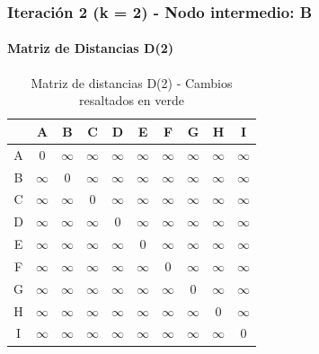 \documentclass[12pt]{article}
\begin{document}
\subsubsection{Iteración 2 (k = 2) - Nodo intermedio: B}
\paragraph{Matriz de Distancias D(2)}
\begin{table}[h!]
\centering
\begin{tabular}{|c|c|c|c|c|c|c|c|c|c|}
\hline
 & A & B & C & D & E & F & G & H & I \\\hline
A & 0 & $\infty$ & $\infty$ & $\infty$ & $\infty$ & $\infty$ & $\infty$ & $\infty$ & $\infty$ \\\hline
B & $\infty$ & 0 & $\infty$ & $\infty$ & $\infty$ & $\infty$ & $\infty$ & $\infty$ & $\infty$ \\\hline
C & $\infty$ & $\infty$ & 0 & $\infty$ & $\infty$ & $\infty$ & $\infty$ & $\infty$ & $\infty$ \\\hline
D & $\infty$ & $\infty$ & $\infty$ & 0 & $\infty$ & $\infty$ & $\infty$ & $\infty$ & $\infty$ \\\hline
E & $\infty$ & $\infty$ & $\infty$ & $\infty$ & 0 & $\infty$ & $\infty$ & $\infty$ & $\infty$ \\\hline
F & $\infty$ & $\infty$ & $\infty$ & $\infty$ & $\infty$ & 0 & $\infty$ & $\infty$ & $\infty$ \\\hline
G & $\infty$ & $\infty$ & $\infty$ & $\infty$ & $\infty$ & $\infty$ & 0 & $\infty$ & $\infty$ \\\hline
H & $\infty$ & $\infty$ & $\infty$ & $\infty$ & $\infty$ & $\infty$ & $\infty$ & 0 & $\infty$ \\\hline
I & $\infty$ & $\infty$ & $\infty$ & $\infty$ & $\infty$ & $\infty$ & $\infty$ & $\infty$ & 0 \\\hline
\end{tabular}
\caption{Matriz de distancias D(2) - Cambios resaltados en verde}
\end{table}
\end{document}
